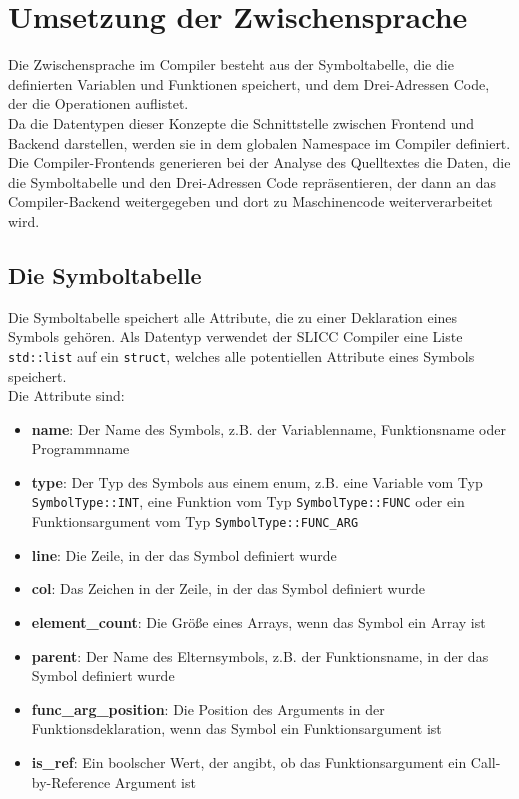 \chapter{Umsetzung der Zwischensprache}
\label{chap:build:inBetweenState}

Die Zwischensprache im Compiler besteht aus der Symboltabelle, die die definierten Variablen und Funktionen speichert, und dem Drei-Adressen Code, der die Operationen auflistet.\\
Da die Datentypen dieser Konzepte die Schnittstelle zwischen Frontend und Backend darstellen, werden sie in dem globalen Namespace im Compiler definiert.
Die Compiler-Frontends generieren bei der Analyse des Quelltextes die Daten, die die Symboltabelle und den Drei-Adressen Code repräsentieren, der dann an das Compiler-Backend weitergegeben und dort zu Maschinencode weiterverarbeitet wird.\\


\section{Die Symboltabelle}

Die Symboltabelle speichert alle Attribute, die zu einer Deklaration eines Symbols gehören.
Als Datentyp verwendet der \ac{SLICC} Compiler eine Liste \texttt{std::list} auf ein \texttt{struct}, welches alle potentiellen Attribute eines Symbols speichert.\\
Die Attribute sind:

\begin{itemize}
  \item \textbf{name}: Der Name des Symbols, z.B. der Variablenname, Funktionsname oder Programmname
  \item \textbf{type}: Der Typ des Symbols aus einem enum, z.B. eine Variable vom Typ \texttt{SymbolType::INT}, eine Funktion vom Typ \texttt{SymbolType::FUNC} oder ein Funktionsargument vom Typ \texttt{SymbolType::FUNC_ARG}
  \item \textbf{line}: Die Zeile, in der das Symbol definiert wurde
  \item \textbf{col}: Das Zeichen in der Zeile, in der das Symbol definiert wurde
  \item \textbf{element\_count}: Die Größe eines Arrays, wenn das Symbol ein Array ist
  \item \textbf{parent}: Der Name des Elternsymbols, z.B. der Funktionsname, in der das Symbol definiert wurde
  \item \textbf{func\_arg\_position}: Die Position des Arguments in der Funktionsdeklaration, wenn das Symbol ein Funktionsargument ist
  \item \textbf{is\_ref}: Ein boolscher Wert, der angibt, ob das Funktionsargument ein Call-by-Reference Argument ist
\end{itemize}

